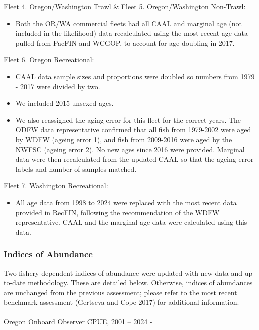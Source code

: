 \documentclass[
]{scrartcl}
\makeatletter
\let\oldparagraph\paragraph
\renewcommand{\paragraph}{
    \@ifstar
      \xxxParagraphStar
      \xxxParagraphNoStar
  }
\newcommand{\xxxParagraphStar}[1]{\oldparagraph*{#1}\mbox{}}
\newcommand{\xxxParagraphNoStar}[1]{\oldparagraph{#1}\mbox{}}
\providecommand{\tightlist}{%
  \setlength{\itemsep}{0pt}\setlength{\parskip}{0pt}}\usepackage{longtable,booktabs,array}
\makeatother
\begin{document}
Fleet 4. Oregon/Washington Trawl \& Fleet 5. Oregon/Washington
Non-Trawl:

\begin{itemize}
\tightlist
\item
  Both the OR/WA commercial fleets had all CAAL and marginal age (not
  included in the likelihood) data recalculated using the most recent
  age data pulled from PacFIN and WCGOP, to account for age doubling in
  2017.
\end{itemize}

Fleet 6. Oregon Recreational:

\begin{itemize}
\tightlist
\item
  CAAL data sample sizes and proportions were doubled so numbers from
  1979 - 2017 were divided by two.
\item
  We included 2015 unsexed ages.
\item
  We also reassigned the aging error for this fleet for the correct
  years. The ODFW data representative confirmed that all fish from
  1979-2002 were aged by WDFW (ageing error 1), and fish from 2009-2016
  were aged by the NWFSC (ageing error 2). No new ages since 2016 were
  provided. Marginal data were then recalculated from the updated CAAL
  so that the ageing error labels and number of samples matched.
\end{itemize}

Fleet 7. Washington Recreational:

\begin{itemize}
\tightlist
\item
  All age data from 1998 to 2024 were replaced with the most recent data
  provided in RecFIN, following the recommendation of the WDFW
  representative. CAAL and the marginal age data were calculated using
  this data.
\end{itemize}

\subsubsection{Indices of Abundance}\label{indices-of-abundance}

Two fishery-dependent indices of abundance were updated with new data
and up-to-date methodology. These are detailed below. Otherwise, indices
of abundances are unchanged from the previous assessment; please refer
to the most recent benchmark assessment (Gertseva and Cope 2017) for
additional information.

\paragraph{Oregon Onboard Observer CPUE, 2001 -- 2024
-}\label{oregon-onboard-observer-cpue-2001-2024--}
\end{document}
